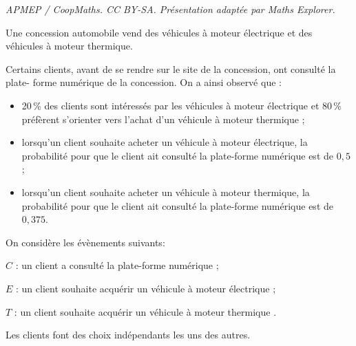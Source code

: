 \documentclass[10pt]{article}
\begin{document}
\noindent\textit{APMEP / CoopMaths. CC BY-SA. Présentation adaptée par Maths Explorer.}\par\medskip
\medskip

Une concession automobile vend des véhicules à moteur électrique et des véhicules à moteur thermique.

Certains clients, avant de se rendre sur le site de la concession, ont consulté la plate- forme numérique de la concession. On a ainsi observé que :
\begin{itemize}
\item[$\bullet$~~]20\,\% des clients sont intéressés par les véhicules à moteur électrique et 80\,\% préfèrent s'orienter vers l'achat d'un véhicule à moteur thermique ;
\item[$\bullet$~~]lorsqu'un client souhaite acheter un véhicule à moteur électrique, la probabilité pour que le client ait consulté la plate-forme numérique est de $0,5$ ;
\item[$\bullet$~~]lorsqu'un client souhaite acheter un véhicule à moteur thermique, la probabilité pour que le client ait consulté la plate-forme numérique est de $0,375$.
\end{itemize}

\begin{list}{\textbullet}{On considère les évènements suivants:}
\item $C$ : \og un client a consulté la plate-forme numérique \fg{} ;
\item $E$ : \og un client souhaite acquérir un véhicule à moteur électrique \fg{} ;
\item $T$ : \og un client souhaite acquérir un véhicule à moteur thermique \fg.
\end{list}

Les clients font des choix indépendants les uns des autres.

\medskip
\end{document}
